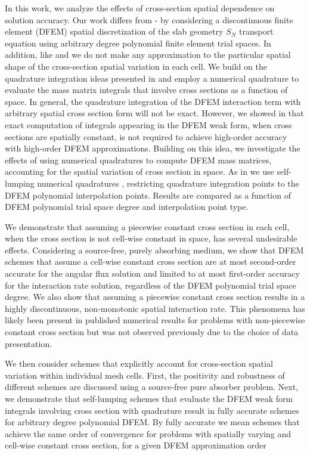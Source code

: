 In this work, we analyze the effects of cross-section spatial dependence on solution accuracy.
Our work differs from \cite{varXS_diff}-\cite{adams_nowak} by considering a discontinuous finite element (DFEM) spatial discretization of the slab geometry $S_N$ transport equation using arbitrary degree polynomial finite element trial spaces.  
In addition, like \cite{adams_scb} and \cite{adams_nowak} we do not make any approximation to the particular spatial shape of the cross-section spatial variation in each cell.
We build on the quadrature integration ideas presented in \cite{part_1_paper} and employ a numerical quadrature to evaluate the mass matrix integrals that involve cross sections as a function of space.
In general, the quadrature integration of the DFEM interaction term with arbitrary spatial cross section form will not be exact.
However, we showed in  that exact computation of integrals appearing in the DFEM weak form, when cross sections are spatially constant, is not required to achieve high-order accuracy with high-order DFEM approximations.  
Building on this idea, we investigate the effects of using numerical quadratures to compute DFEM mass matrices, accounting for the spatial variation of cross section in space.
As in  we use self-lumping numerical quadratures \cite{raviart, thomee}, restricting quadrature integration points to the DFEM polynomial interpolation points.
Results are compared as a function of DFEM polynomial trial space degree and interpolation point type.

We demonstrate that assuming a piecewise constant cross section in each cell, when the cross section is not cell-wise constant in space, has several undesirable effects.  
Considering a source-free, purely absorbing medium, we show that DFEM schemes that assume a cell-wise constant cross section are at most second-order accurate for the angular flux solution and limited to at most first-order accuracy for the interaction rate solution, regardless of the DFEM polynomial trial space degree.  
We also show that assuming a piecewise constant cross section results in a highly discontinuous, non-monotonic spatial interaction rate.  
This phenomena has likely been present in published numerical results for problems with non-piecewise constant cross section but was not observed previously due to the choice of data presentation.

We then consider schemes that explicitly account for cross-section spatial variation within individual mesh cells.
First, the positivity and robustness of different schemes are discussed using a source-free pure absorber problem.
Next, we demonstrate that self-lumping schemes that evaluate the DFEM weak form integrals involving cross section with quadrature 
result in fully accurate schemes for arbitrary degree polynomial DFEM. 
By fully accurate we mean schemes that achieve the same order of convergence for problems with spatially varying and cell-wise constant cross section, for a given DFEM approximation order

